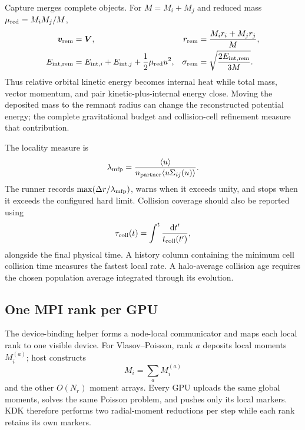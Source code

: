 Capture merges complete objects.  For \(M=M_i+M_j\) and reduced mass
\(\mu_{\rm red}=M_iM_j/M\),
\begin{align}
 \bm v_{\rm rem}&=\bm V,
 &r_{\rm rem}&=\frac{M_ir_i+M_jr_j}{M},\\
 E_{{\rm int},{\rm rem}}&=E_{{\rm int},i}+E_{{\rm int},j}
 +\frac12\mu_{\rm red}u^2,
 &\sigma_{\rm rem}&=\sqrt{\frac{2E_{{\rm int},{\rm rem}}}{3M}}.
\end{align}
Thus relative orbital kinetic energy becomes internal heat while total mass,
vector momentum, and pair kinetic-plus-internal energy close.  Moving the
deposited mass to the remnant radius can change the reconstructed potential
energy; the complete gravitational budget and collision-cell refinement
measure that contribution.

The locality measure is
\begin{equation}
 \lambda_{\rm mfp}=
 \frac{\langle u\rangle}
 {n_{\rm partner}\langle u\Sigma_{ij}(u)\rangle}.
\end{equation}
The runner records \(\max(\Delta r/\lambda_{\rm mfp})\), warns when it
exceeds unity, and stops when it exceeds the configured hard limit.  Collision coverage should also be reported using
\begin{equation}
 \tau_{\rm coll}(t)=\int^t\frac{\mathrm d t'}{t_{\rm coll}(t')},
\end{equation}
alongside the final physical time. A history column containing the minimum
cell collision time measures the fastest local rate. A halo-average collision
age requires the chosen population average integrated through its evolution.

\subsection{One MPI rank per GPU}

The device-binding helper forms a node-local communicator and maps each local
rank to one visible device.  For Vlasov--Poisson, rank \(a\) deposits local
moments \(M_i^{(a)}\); host  constructs
\begin{equation}
 M_i=\sum_a M_i^{(a)}
\end{equation}
and the other \(O(N_r)\) moment arrays.  Every GPU uploads the same global
moments, solves the same Poisson problem, and pushes only its local markers.
KDK therefore performs two radial-moment reductions per step while each
rank retains its own markers.

